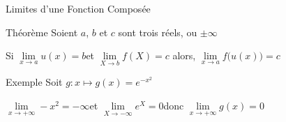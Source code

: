 \documentclass{cours}
\begin{document}
    \begin{Gpartie}{Limites d'une Fonction Composée} 
        \begin{Spartie}{Théorème} 
            Soient $a$, $b$ et $c$ sont trois réels, ou $\pm\infty$

            Si \qquad$\lim\limits_{x\to a}u(x)=b$\qquad et \qquad $\lim\limits_{X\to b}f(X)=c$ \qquad alors, \qquad $\lim\limits_{x\to a}f\big(u(x)\big)=c$
        \end{Spartie}
        \begin{Spartie}{Exemple} 
            Soit $g:x\mapsto g(x)=e^{-x^2}$

            $\lim\limits_{x\to +\infty} -x^2=-\infty$\qquad et \qquad$\lim\limits_{X\to -\infty} e^X=0$\qquad donc \qquad$\lim\limits_{x\to +\infty}g(x)=0$
        \end{Spartie}
    \end{Gpartie}
\end{document}
